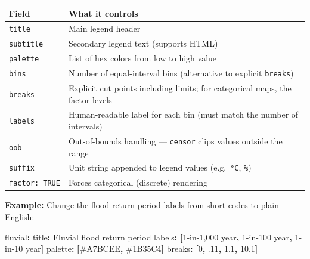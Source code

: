 \documentclass[
  letterpaper,
  DIV=11,
  numbers=noendperiod]{scrreprt}
\newenvironment{Shaded}{\begin{snugshade}}{\end{snugshade}}
\newcommand{\AttributeTok}[1]{\textcolor[rgb]{0.40,0.45,0.13}{#1}}
\newcommand{\DecValTok}[1]{\textcolor[rgb]{0.68,0.00,0.00}{#1}}
\newcommand{\FloatTok}[1]{\textcolor[rgb]{0.68,0.00,0.00}{#1}}
\newcommand{\FunctionTok}[1]{\textcolor[rgb]{0.28,0.35,0.67}{#1}}
\newcommand{\KeywordTok}[1]{\textcolor[rgb]{0.00,0.23,0.31}{\textbf{#1}}}
\newcommand{\StringTok}[1]{\textcolor[rgb]{0.13,0.47,0.30}{#1}}
\newcounter{none} %
\begin{document}
{\def\LTcaptype{none} %
\begin{longtable}[]{@{}
  >{\raggedright\arraybackslash}p{}
  >{\raggedright\arraybackslash}p{}@{}}
\toprule\noalign{}
\begin{minipage}[b]{\linewidth}\raggedright
Field
\end{minipage} & \begin{minipage}[b]{\linewidth}\raggedright
What it controls
\end{minipage} \\
\midrule\noalign{}
\endhead
\bottomrule\noalign{}
\endlastfoot
\texttt{title} & Main legend header \\
\texttt{subtitle} & Secondary legend text (supports HTML) \\
\texttt{palette} & List of hex colors from low to high value \\
\texttt{bins} & Number of equal-interval bins (alternative to explicit
\texttt{breaks}) \\
\texttt{breaks} & Explicit cut points including limits; for categorical
maps, the factor levels \\
\texttt{labels} & Human-readable label for each bin (must match the
number of intervals) \\
\texttt{oob} & Out-of-bounds handling --- \texttt{censor} clips values
outside the range \\
\texttt{suffix} & Unit string appended to legend values
(e.g.~\texttt{°C}, \texttt{\%}) \\
\texttt{factor:\ TRUE} & Forces categorical (discrete) rendering \\
\end{longtable}
}

\textbf{Example:} Change the flood return period labels from short codes
to plain English:

\begin{Shaded}
\begin{Highlighting}[]
\FunctionTok{fluvial}\KeywordTok{:}
\AttributeTok{  }\FunctionTok{title}\KeywordTok{:}\AttributeTok{ }\StringTok{\textquotesingle{}Fluvial flood return period\textquotesingle{}}
\AttributeTok{  }\FunctionTok{labels}\KeywordTok{:}\AttributeTok{ }\KeywordTok{[}\StringTok{\textquotesingle{}1{-}in{-}1,000 year\textquotesingle{}}\KeywordTok{,}\AttributeTok{ }\StringTok{\textquotesingle{}1{-}in{-}100 year\textquotesingle{}}\KeywordTok{,}\AttributeTok{ }\StringTok{\textquotesingle{}1{-}in{-}10 year\textquotesingle{}}\KeywordTok{]}
\AttributeTok{  }\FunctionTok{palette}\KeywordTok{:}\AttributeTok{ }\KeywordTok{[}\StringTok{\textquotesingle{}\#A7BCEE\textquotesingle{}}\KeywordTok{,}\AttributeTok{ }\StringTok{\textquotesingle{}\#1B35C4\textquotesingle{}}\KeywordTok{]}
\AttributeTok{  }\FunctionTok{breaks}\KeywordTok{:}\AttributeTok{ }\KeywordTok{[}\DecValTok{0}\KeywordTok{,}\AttributeTok{ }\FloatTok{.11}\KeywordTok{,}\AttributeTok{ }\FloatTok{1.1}\KeywordTok{,}\AttributeTok{ }\FloatTok{10.1}\KeywordTok{]}
\end{Highlighting}
\end{Shaded}
\end{document}
